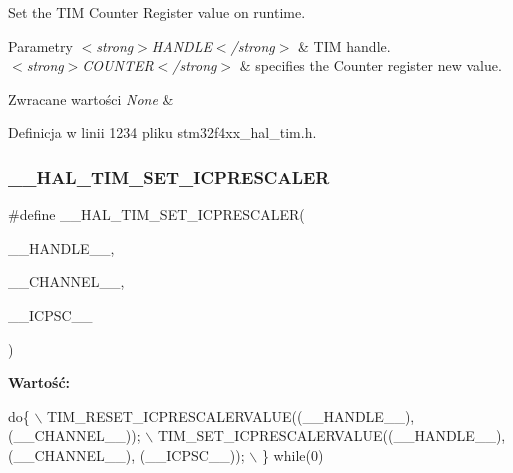 Set the T\+IM Counter Register value on runtime. 


\begin{DoxyParams}{Parametry}
{\em $<$strong$>$\+H\+A\+N\+D\+L\+E$<$/strong$>$} & T\+IM handle. \\
\hline
{\em $<$strong$>$\+C\+O\+U\+N\+T\+E\+R$<$/strong$>$} & specifies the Counter register new value. \\
\hline
\end{DoxyParams}

\begin{DoxyRetVals}{Zwracane wartości}
{\em None} & \\
\hline
\end{DoxyRetVals}


Definicja w linii 1234 pliku stm32f4xx\+\_\+hal\+\_\+tim.\+h.

\mbox{\label{group___t_i_m___exported___macros_gaeb106399b95ef02cec502f58276a0e92}} 
\subsubsection{\texorpdfstring{\+\_\+\+\_\+\+H\+A\+L\+\_\+\+T\+I\+M\+\_\+\+S\+E\+T\+\_\+\+I\+C\+P\+R\+E\+S\+C\+A\+L\+ER}{\_\_HAL\_TIM\_SET\_ICPRESCALER}}
{\footnotesize\ttfamily \#define \+\_\+\+\_\+\+H\+A\+L\+\_\+\+T\+I\+M\+\_\+\+S\+E\+T\+\_\+\+I\+C\+P\+R\+E\+S\+C\+A\+L\+ER(\begin{DoxyParamCaption}\item[{}]{\+\_\+\+\_\+\+H\+A\+N\+D\+L\+E\+\_\+\+\_\+,  }\item[{}]{\+\_\+\+\_\+\+C\+H\+A\+N\+N\+E\+L\+\_\+\+\_\+,  }\item[{}]{\+\_\+\+\_\+\+I\+C\+P\+S\+C\+\_\+\+\_\+ }\end{DoxyParamCaption})}

{\bfseries Wartość\+:}
\begin{DoxyCode}
\textcolor{keywordflow}{do}\{                                                    \(\backslash\)
    TIM\_RESET\_ICPRESCALERVALUE((\_\_HANDLE\_\_), (\_\_CHANNEL\_\_));  \(\backslash\)
    TIM\_SET\_ICPRESCALERVALUE((\_\_HANDLE\_\_), (\_\_CHANNEL\_\_), (\_\_ICPSC\_\_)); \(\backslash\)
  \} \textcolor{keywordflow}{while}(0)
\end{DoxyCode}


